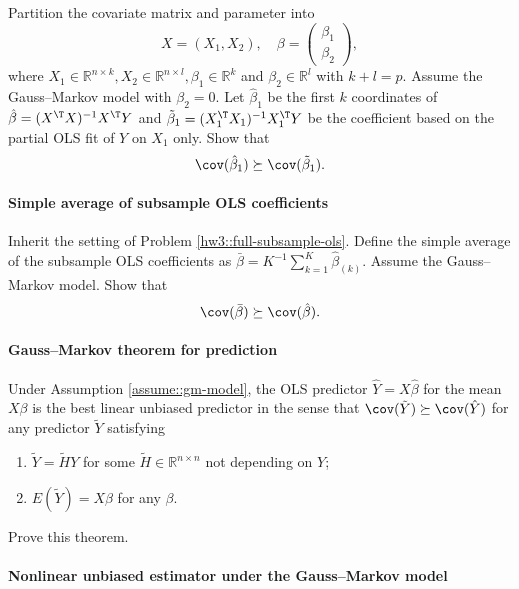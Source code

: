 Partition the covariate matrix and parameter into 
$$
X=(X_1, X_2),\quad \beta = \begin{pmatrix}
\beta_1\\
\beta_2
\end{pmatrix},
$$
where $X_1 \in \mathbb{R}^{n\times k}, X_2 \in \mathbb{R}^{n\times l}, \beta_1 \in \mathbb{R}^k$ and $\beta_2 \in \mathbb{R}^l$ with $k+l=p$. Assume the Gauss--Markov model with $\beta_2 = 0$. Let $\hat{\beta}_1$ be the first $k$ coordinates of $\hat{\beta} = (X^{\T}X)^{-1} X^{\T} Y$ and $\tilde{\beta}_1 = (X_1^{\T}X_1)^{-1} X_1^{\T} Y$ be the coefficient based on the partial OLS fit of $Y$ on $X_1$ only. Show that 
$$
\cov(\hat{\beta}_1) \succeq \cov(\tilde{\beta}_1).
$$


 
 
 \paragraph{Simple average of subsample OLS coefficients}\label{hw4::average-subsample-ols}
 
 Inherit the setting of Problem \ref{hw3::full-subsample-ols}. Define the simple average of the subsample OLS coefficients as $\bar{\beta} = K^{-1}\sum_{k=1}^{K} \hat{\beta}_{(k)}$. Assume the Gauss--Markov model. Show that 
 $$
\cov(\bar{\beta}) \succeq \cov(\hat{\beta}).
$$


 
 \paragraph{Gauss--Markov theorem for prediction}\label{hw4::gaussmarkov-prediction}

Under Assumption \ref{assume::gm-model}, the OLS predictor 
$\hat{Y}=X\hat{\beta}$ for the mean $X\beta$ is the best linear unbiased predictor in the sense that $\cov(\tilde{Y}) \succeq \cov( \hat{Y} )$
for any predictor $\tilde{Y}$ satisfying 
\begin{enumerate}
[(C1)]
\item\label{item::gm-linear-pred} $\tilde{Y}=\tilde{H}Y$ for some $ \tilde{H} \in\mathbb{R}^{n \times n}$ not depending
on $Y$;
\item\label{item::gm-unbiased-pred} $E ( \tilde{Y} ) = X \beta$   for any $\beta$. 
\end{enumerate}
Prove this theorem. 




\paragraph{Nonlinear unbiased estimator under the Gauss--Markov model}
\label{hw4::nonlinear-unbiased-underGM}

